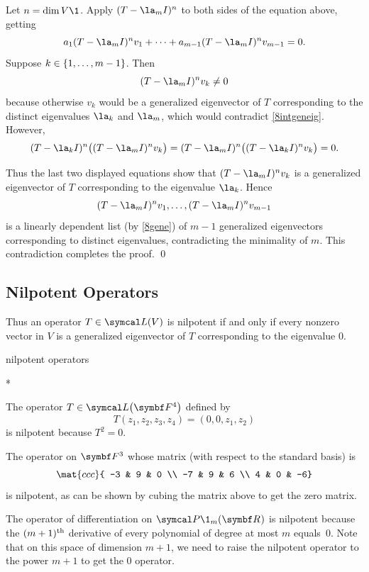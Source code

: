 Let $n = \dim V\1$. Apply $(T - \la_m I)^n$ to both sides of the equation above, getting
\begin{equation}
a_1 (T - \la_m I)^n v_1 + \cdots + a_{m-1} (T - \la_m I)^n v_{m-1} = 0. \label{8gene}
\end{equation}%
Suppose $k \in \{1, \ldots, m-1\}$. Then
\[(T - \la_m I)^n v_k \ne 0
\]
because otherwise $v_k$ would be a generalized eigenvector of $T$  corresponding to the distinct eigenvalues $\la_k$ and $\la_m$, which would contradict \ref{8intgeneig}. However,
\[
(T - \la_k I)^n \paren[\big]{ (T - \la_m I)^n v_k } = (T - \la_m I)^n \paren[\big]{ (T - \la_k I)^n v_k } = 0.
\]

Thus the last two displayed equations show that $(T - \la_m I)^n v_k$ is a generalized eigenvector of $T$ corresponding to the eigenvalue $\la_k$.
Hence
\[(T - \la_m I)^n v_1, \ldots, (T - \la_m I)^n v_{m-1}
\]
is a linearly dependent list (by \ref{8gene}) of $m-1$ generalized eigenvectors corresponding to distinct eigenvalues, contradicting the minimality of $m$. This contradiction completes the proof.
\qed

\subsection{Nilpotent Operators}


Thus an operator $T \in \L(V)$ is nilpotent if and only if every nonzero vector in $V$ is a generalized eigenvector of $T$ corresponding to the eigenvalue $0$.

\pagebreak[3]

\begin{example}[8nil]{nilpotent operators}
\begin{subtheorem}*
\item
The operator $T \in \L\paren[\big]{\F{4}}$ defined by
\[
T(z_1, z_2, z_3, z_4) = (0, 0, z_1, z_2)
\]
is nilpotent because $T^2 = 0$.

\item
The operator on $\F3$ whose matrix (with respect to the standard basis) is
\[
\mat{ccc}{
-3 & 9 & 0 \\
-7 & 9 & 6 \\
4 & 0 & -6}
\]
is nilpotent, as can be shown by cubing the matrix above to get the zero matrix.

\item
The operator of differentiation on $\P\1_m(\R{})$ is nilpotent because the $(m + 1)^{{\text{{th}}}}$
derivative of every polynomial of degree at most $m$ equals~$0$.  Note that on
this space of dimension $m + 1$, we need to raise the nilpotent operator to the
power $m + 1$ to get the $0$ operator.
\end{subtheorem}
\exampleitemend
\end{example}

